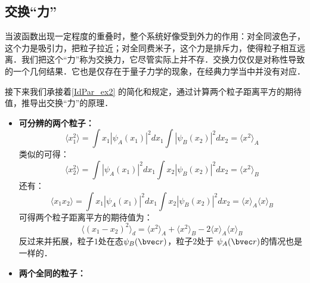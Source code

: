 \subsection{交换“力”}
当波函数出现一定程度的重叠时，整个系统好像受到外力的作用：对全同波色子，这个力是吸引力，把粒子拉近；对全同费米子，这个力是排斥力，使得粒子相互远离．我们把这个“力”称为交换力，它尽管实际上并不存．交换力仅仅是对称性导致的一个几何结果．它也是仅存在于量子力学的现象，在经典力学当中并没有对应．

接下来我们承接着\autoref{IdPar_ex2} 的简化和规定，通过计算两个粒子距离平方的期待值，推导出交换“力”的原理．

\begin{itemize}
\item \textbf{可分辨的两个粒子：}
\begin{equation}
\langle x_1^2\rangle = \int x_1|\psi_A(x_1)|^2dx_1\int |\psi_B(x_2)|^2dx_2=\langle x^2\rangle_A
\end{equation}
类似的可得：
\begin{equation}
\langle x_2^2\rangle = \int |\psi_A(x_1)|^2dx_1\int x_2 |\psi_B(x_2)|^2dx_2=\langle x^2\rangle_B
\end{equation}
还有：
\begin{equation}
\langle x_1x_2\rangle = \int  x_1|\psi_A(x_1)|^2dx_1\int x_2 |\psi_B(x_2)|^2dx_2=\langle x\rangle_A\langle x\rangle_B
\end{equation}
可得两个粒子距离平方的期待值为：
\begin{equation}\label{IdPar_eq7}
\langle (x_1-x_2)^2\rangle_d=\langle x^2\rangle_A+\langle x^2\rangle_B-2\langle x\rangle_A\langle x\rangle_B
\end{equation}
反过来并拓展，粒子$ 1 $处在态$\psi_B(\bvec r)$，粒子$ 2 $处于 $\psi_A(\bvec r)$的情况也是一样的．

\item \textbf{两个全同的粒子：}


\end{itemize}
